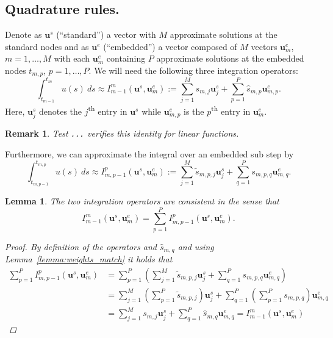 \documentclass{article}
\newtheorem{remark}{Remark}
\newtheorem{lemma}{Lemma}
\newcommand{\ve}[1]{\mathbf{#1}}
\begin{document}
\subsection*{Quadrature rules.}
Denote as $\ve{u}^{s}$ (``standard'') a vector with $M$ approximate solutions at the standard nodes and as $\ve{u}^{e}$ (``embedded'') a vector composed of $M$ vectors $\ve{u}^{e}_{m}$, $m=1,\ldots,M$ with each $\ve{u}^{e}_{m}$ containing $P$ approximate solutions at the embedded nodes $t_{m,p}$, $p=1, \ldots, P$.
We will need the following three integration operators:
\begin{equation}
	\int_{t_{m-1}}^{t_{m}} u(s)~ds \approx I_{m-1}^{m}(\ve{u}^s, \ve{u}^{e}_{m}) := \sum_{j=1}^{M} s_{m,j} \ve{u}^{s}_{j} + \sum_{p=1}^{P} \hat{s}_{m,p} \ve{u}^{e}_{m,p}.
\end{equation}
Here, $\ve{u}^{s}_{j}$ denotes the $j$\textsuperscript{th} entry in $\ve{u}^{s}$ while $\ve{u}^{e}_{m,p}$ is the $p$\textsuperscript{th} entry in $\ve{u}^{e}_{m}$.
\begin{remark}
Test \texttt{...} verifies this identity for linear functions.
\end{remark}
Furthermore, we can approximate the integral over an embedded sub step by
\begin{equation}
	\int_{t_{m,p-1}}^{t_{m,p}} u(s)~ds \approx I_{m,p-1}^{p}(\ve{u}^s, \ve{u}^{e}_{m}) := \sum_{j=1}^{M} \tilde{s}_{m,p,j} \ve{u}^{s}_{j} + \sum_{q=1}^{P} s_{m,p,q} \ve{u}^{e}_{m,q}.
\end{equation}
\begin{lemma}\label{lemma:quadrature_match}
The two integration operators are consistent in the sense that
\begin{equation}
	I_{m-1}^{m}(\ve{u}^s, \ve{u}^{e}_{m}) = \sum_{p=1}^{P} I_{m,p-1}^{p}(\ve{u}^s, \ve{u}^{e}_{m}).
\end{equation}
\begin{proof}
By definition of the operators and $\hat{s}_{m,q}$ and using Lemma~\ref{lemma:weights_match} it holds that
\begin{align*}
	\sum_{p=1}^{P} I_{m,p-1}^{p}(\ve{u}^s, \ve{u}^{e}_{m}) &= \sum_{p=1}^{P} \left( \sum_{j=1}^{M} \tilde{s}_{m,p,j} \ve{u}^{s}_j + \sum_{q=1}^{P} s_{m,p,q} \ve{u}^{e}_{m,q} \right) \\
		&= \sum_{j=1}^{M} \left( \sum_{p=1}^{P} \tilde{s}_{m,p,j} \right) \ve{u}^{s}_{j} + \sum_{q=1}^{P} \left( \sum_{p=1}^{P} s_{m,p,q} \right) \ve{u}^{e}_{m,q} \\
		&= \sum_{j=1}^{M} s_{m,j} \ve{u}^{s}_{j} + \sum_{q=1}^{P} \hat{s}_{m,q} \ve{u}^{e}_{m,q} = I_{m-1}^{m}(\ve{u}^s, \ve{u}^{e}_{m})
\end{align*}
\end{proof}
\end{lemma}
%
%
%
\end{document}
